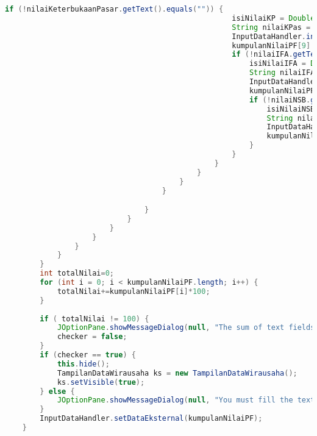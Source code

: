 \begin{lstlisting}[language=Java, caption=TampilanKondisiEksternal.java]
                                                if (!nilaiKeterbukaanPasar.getText().equals("")) {
                                                    isiNilaiKP = Double.parseDouble(nilaiKeterbukaanPasar.getText()) / 100.0;
                                                    String nilaiKPas = Double.toString(isiNilaiKP);
                                                    InputDataHandler.inputDataEksternal("nilaiKeterbukaanPasar", nilaiKPas);
                                                    kumpulanNilaiPF[9] = Double.parseDouble(InputDataHandler.getValue("nilaiKeterbukaanPasar"));
                                                    if (!nilaiIFA.getText().equals("")) {
                                                        isiNilaiIFA = Double.parseDouble(nilaiIFA.getText()) / 100.0;
                                                        String nilaiIFA = Double.toString(isiNilaiIFA);
                                                        InputDataHandler.inputDataEksternal("InfrastrukturListrik", nilaiIFA);
                                                        kumpulanNilaiPF[10] = Double.parseDouble(InputDataHandler.getValue("InfrastrukturListrik"));
                                                        if (!nilaiNSB.getText().equals("")) {
                                                            isiNilaiNSB = Double.parseDouble(nilaiNSB.getText()) / 100.0;
                                                            String nilaiNSB = Double.toString(isiNilaiNSB);
                                                            InputDataHandler.inputDataEksternal("NormaSosialBudaya", nilaiNSB);
                                                            kumpulanNilaiPF[11] = Double.parseDouble(InputDataHandler.getValue("NormaSosialBudaya"));
                                                        }
                                                    }
                                                }
                                            }
                                        }
                                    }

                                }
                            }
                        }
                    }
                }
            }
        }
        int totalNilai=0;
        for (int i = 0; i < kumpulanNilaiPF.length; i++) {
            totalNilai+=kumpulanNilaiPF[i]*100;
        }
        
        if ( totalNilai != 100) {
            JOptionPane.showMessageDialog(null, "The sum of text fields must 100%!");
            checker = false;
        }
        if (checker == true) {
            this.hide();
            TampilanDataWirausaha ks = new TampilanDataWirausaha();
            ks.setVisible(true);
        } else {
            JOptionPane.showMessageDialog(null, "You must fill the text field!");
        }
        InputDataHandler.setDataEksternal(kumpulanNilaiPF);
    }                                       


\end{lstlisting}
